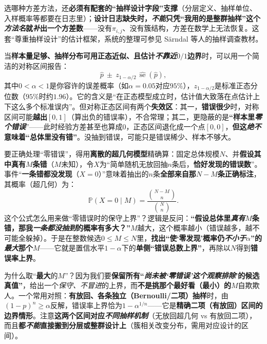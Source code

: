 选哪种方差方法，还\textbf{必须有配套的“抽样设计字段”支撑}（分层定义、抽样单位、入样概率等都要在日志里）；\textbf{设计日志缺失时，\emph{不能}只凭“我用的是整群抽样”这个\emph{方法名}就\emph{补}出一个方差数}——没有$\pi_{i,j}$、没有簇结构，方差在数学上无法恢复。这套“尊重抽样设计”的估计框架，系统的整理可参见 Särndal 等人的抽样调查教材。

当\textbf{样本量足够、抽样分布可用正态近似、且估计\emph{不靠近}$0/1$边界}时，可以用一个简洁的对称区间报告：
$$\widehat p\ \pm\ z_{1-\alpha/2}\,\widehat{\operatorname{se}}(\widehat p),$$
其中$0<\alpha<1$是你容许的误差概率（如$\alpha=0.05$对应$95\%$），$z_{1-\alpha/2}$是标准正态分位数（$95\%$时约$1.96$）。它的含义是“在正态模型成立时，估计值大致落在点估计上下这么多个标准误内”。但对称正态区间有两个\textbf{失效区}：其一，\textbf{错误很少}时，对称区间可能\textbf{越出$[0,1]$}（算出负的错误率），不合常理；其二，更隐蔽的是\textbf{“样本里\emph{零个错误}}”——此时经验方差甚至也算成$0$，正态区间退化成一个点$[0,0]$，\textbf{但这\emph{绝不}意味着“总体里没有错”}。没抽到错误，可能只是错误稀少、样本不够大。

要正确处理“零错误”，得用\textbf{离散的超几何模型}精确算：固定总体规模$N$、并\textbf{假设其中真有$M$条错}（$M$未知），令$X$为“简单随机无放回抽$n$条后，\textbf{恰好发现的错误数}”。事件“\textbf{一条错都没发现}（$X=0$）”意味着抽出的$n$条\textbf{全部来自那$N-M$条正确标注}，其概率（超几何）为：
\begin{equation}
  \mathbb{P}(X=0\mid M)
  =
  \frac{\binom{N-M}{n}}{\binom{N}{n}}.
  \label{eq:knowledge-quality-assessment-correction-zero-hypergeometric}
\end{equation}
这个公式怎么用来做“零错误时的保守上界”？逻辑是反问：\textbf{“假设总体里\emph{真有}$M$条错，那我\emph{一条都没抽到}的概率有多大？”}$M$越大，这个概率越小（错误越多，越不可能全躲掉）。于是在整数候选$0\leq M\leq N$里，\textbf{找出“使‘零发现’概率仍\emph{不小于}$\alpha$”的\emph{最大}那个$M$}——它就是置信水平$1-\alpha$下的\textbf{单侧“错误总数上界”}，再除以$N$得到\textbf{错误率上界}。

为什么取“\textbf{最大}的$M$”？因为我们要\textbf{保留所有“\emph{尚未被‘零错误’这个观察\emph{排除}}’的候选真值”}，给出一个\emph{保守、不冒进}的上界，而\textbf{不是挑那个最好看（最小）的$M$}自欺欺人。一个常用对照：\textbf{有放回、各条独立（Bernoulli/二项）抽样}时，由$(1-p)^n\geq\alpha$反解，错误率上界恰为$1-\alpha^{1/n}$——它是\textbf{精确二项（有放回）区间的边界情形}。注意\textbf{这两个区间对应\emph{不同抽样机制}}（无放回超几何 vs 有放回二项），而且\textbf{都\emph{不能}直接搬到分层或整群设计上}（簇相关改变分布，需用对应设计的区间）。

